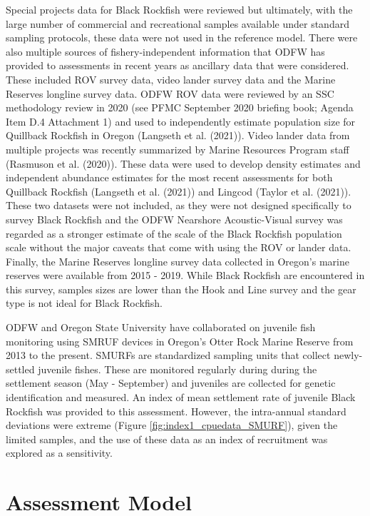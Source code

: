 \documentclass[11pt,
  english,
  letterpaper,
]{article}
\begin{document}
Special projects data for Black Rockfish were reviewed but ultimately, with the large number of commercial and recreational samples available under standard sampling protocols, these data were not used in the reference model. There were also multiple sources of fishery-independent information that ODFW has provided to assessments in recent years as ancillary data that were considered. These included ROV survey data, video lander survey data and the Marine Reserves longline survey data. ODFW ROV data were reviewed by an SSC methodology review in 2020 (see PFMC September 2020 briefing book; Agenda Item D.4 Attachment 1) and used to independently estimate population size for Quillback Rockfish in Oregon (Langseth et al. (2021)). Video lander data from multiple projects was recently summarized by Marine Resources Program staff (Rasmuson et al. (2020)). These data were used to develop density estimates and independent abundance estimates for the most recent assessments for both Quillback Rockfish (Langseth et al. (2021)) and Lingcod (Taylor et al. (2021)). These two datasets were not included, as they were not designed specifically to survey Black Rockfish and the ODFW Nearshore Acoustic-Visual survey was regarded as a stronger estimate of the scale of the Black Rockfish population scale without the major caveats that come with using the ROV or lander data. Finally, the Marine Reserves longline survey data collected in Oregon's marine reserves were available from 2015 - 2019. While Black Rockfish are encountered in this survey, samples sizes are lower than the Hook and Line survey and the gear type is not ideal for Black Rockfish.

ODFW and Oregon State University have collaborated on juvenile fish monitoring using SMRUF devices in Oregon's Otter Rock Marine Reserve from 2013 to the present. SMURFs are standardized sampling units that collect newly-settled juvenile fishes. These are monitored regularly during during the settlement season (May - September) and juveniles are collected for genetic identification and measured. An index of mean settlement rate of juvenile Black Rockfish was provided to this assessment. However, the intra-annual standard deviations were extreme (Figure \ref{fig:index1_cpuedata_SMURF}), given the limited samples, and the use of these data as an index of recruitment was explored as a sensitivity.

\hypertarget{assessment-model}{%
\section{Assessment Model}\label{assessment-model}}
\end{document}
